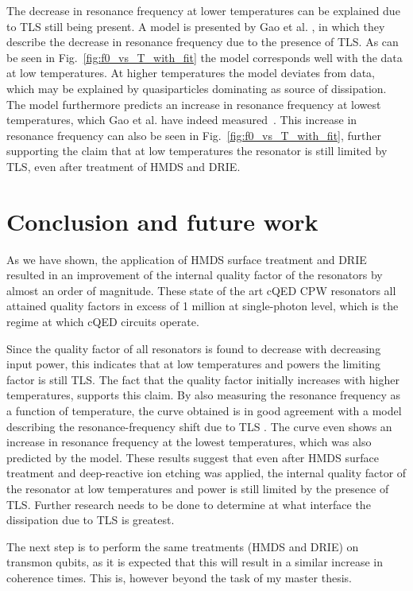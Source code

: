 The decrease in resonance frequency at lower temperatures can be explained due to TLS still being present. A model is presented by Gao et al. \cite{gao2008experimental}, in which they describe the decrease in resonance frequency due to the presence of TLS. As can be seen in Fig.~\ref{fig:f0_vs_T_with_fit} the model corresponds well with the data at low temperatures. At higher temperatures the model deviates from data, which may be explained by quasiparticles dominating as source of dissipation. The model furthermore predicts an increase in resonance frequency at lowest temperatures, which Gao et al. have indeed measured~\cite{gao2008experimental}. This increase in resonance frequency can also be seen in Fig.~\ref{fig:f0_vs_T_with_fit}, further supporting the claim that at low temperatures the resonator is still limited by TLS, even after treatment of HMDS and DRIE.



\chapter{Conclusion and future work}

As we have shown, the application of HMDS surface treatment and DRIE resulted in an improvement of the internal quality factor of the resonators by almost an order of magnitude. These state of the art cQED CPW resonators all attained quality factors in excess of 1 million at single-photon level, which is the regime at which cQED circuits operate.

Since the quality factor of all resonators is found to decrease with decreasing input power, this indicates that at low temperatures and powers the limiting factor is still TLS. The fact that the quality factor initially increases with higher temperatures, supports this claim. By also measuring  the resonance frequency as a function of temperature, the curve obtained is in good agreement with a model describing the resonance-frequency shift due to TLS \cite{gao2008experimental}. The curve even shows an increase in resonance frequency at the lowest temperatures, which was also predicted by the model. These results suggest that even after HMDS surface treatment and deep-reactive ion etching was applied, the internal quality factor of the resonator at low temperatures and power is still limited by the presence of TLS. Further research needs to be done to determine at what interface the dissipation due to TLS is greatest.

The next step is to perform the same treatments (HMDS and DRIE) on transmon qubits, as it is expected that this will result in a similar increase in coherence times. This is, however beyond the task of my master thesis.
